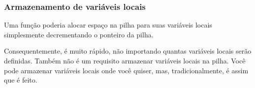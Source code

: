 \subsubsection{Armazenamento de variáveis locais}

Uma função poderia alocar espaço na pilha para suas variáveis locais simplesmente decrementando o ponteiro da pilha.


Consequentemente, é muito rápido, não importando quantas variáveis locais serão definidas.
Também não é um requisito armazenar variáveis locais na pilha.
Você pode armazenar variáveis locais onde você quiser, mas, tradicionalmente, é assim que é feito.

